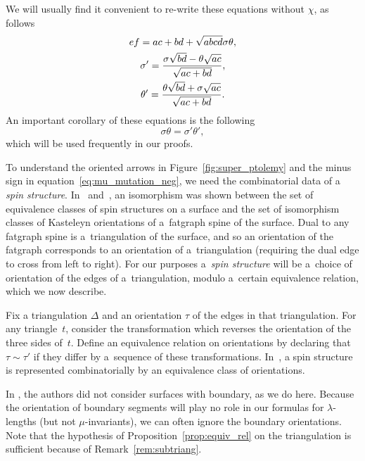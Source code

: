\documentclass[pdftex]{sigma}
\numberwithin{equation}{section}
\begin{document}
We will usually find it convenient to re-write these equations without $\chi$, as follows
\begin{gather}
 ef = ac+bd+\sqrt{abcd} \sigma\theta, \label{eq:mutation}\\
 \sigma' = {{\sigma\sqrt{bd}-\theta\sqrt{ac}}\over{\sqrt{ac+bd}}}, \label{eq:mu_mutation_neg} \\
 \theta' = {{ \theta\sqrt{bd}+\sigma \sqrt{ac}}\over{\sqrt{ac+bd}}}.\label{eq:mu_mutation_pos}
\end{gather}
An important corollary of these equations is the following
\begin{equation}\label{eq:mu_cross}
	\sigma\theta=\sigma'\theta',
\end{equation}
which will be used frequently in our proofs.

To understand the oriented arrows in Figure~\ref{fig:super_ptolemy} and the minus sign in equation~\eqref{eq:mu_mutation_neg},
we need the combinatorial data of a \emph{spin structure}. In~\cite{cr_07} and~\cite{cr_08}, an isomorphism was shown between
the set of equivalence classes of spin structures on a surface and the set of isomorphism classes of Kasteleyn orientations
of a~fatgraph spine of the surface. Dual to any fatgraph spine is a~triangulation of the surface, and so an orientation of
the fatgraph corresponds to an orientation of a~triangulation (requiring the dual edge to cross from left to right). For our
purposes a~\emph{spin structure} will be a~choice of orientation of the edges of a~triangulation, modulo a~certain equivalence relation,
which we now describe.

Fix a triangulation $\Delta$ and an orientation $\tau$ of the edges in that triangulation. For any triangle~$t$,
consider the transformation which reverses the orientation of the three sides of~$t$. Define an equivalence relation on orientations by declaring that $\tau \sim \tau'$ if they differ by a~sequence of these transformations. In~\cite{pz_19}, a spin
structure is represented combinatorially by an equivalence class of orientations.

In \cite{pz_19}, the authors did not consider surfaces with boundary, as we do here. Because the orientation of boundary segments
will play no role in our formulas for $\lambda$-lengths (but not $\mu$-invariants), we can often ignore the boundary orientations.
Note that the hypothesis of Proposition~\ref{prop:equiv_rel} on the triangulation is sufficient because of Remark~\ref{rem:subtriang}.
\end{document}
